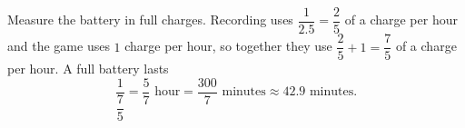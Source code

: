 Measure the battery in full charges. Recording uses $\dfrac{1}{2.5}=\dfrac{2}{5}$ of a charge per hour and the game uses $1$ charge per hour, so together they use $\dfrac{2}{5}+1=\dfrac{7}{5}$ of a charge per hour. A full battery lasts
\[\dfrac{1}{\dfrac{7}{5}}=\boxed{\dfrac{5}{7}\text{ hour}}=\dfrac{300}{7}\text{ minutes}\approx42.9\text{ minutes}.\]
